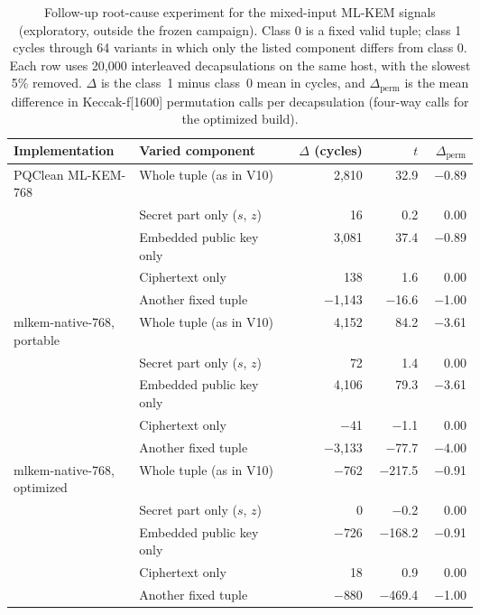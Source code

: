 \begin{table}[h]
\centering
\caption{Follow-up root-cause experiment for the mixed-input ML-KEM signals (exploratory, outside the frozen campaign). Class 0 is a fixed valid tuple; class 1 cycles through 64 variants in which only the listed component differs from class 0. Each row uses 20,000 interleaved decapsulations on the same host, with the slowest 5\% removed. $\Delta$ is the class~1 minus class~0 mean in cycles, and $\Delta_{\mathrm{perm}}$ is the mean difference in Keccak-f[1600] permutation calls per decapsulation (four-way calls for the optimized build).}
\label{tab:mlkem-rootcause}
\scriptsize
\setlength{\tabcolsep}{3pt}
\begin{tabular}{@{}>{\raggedright\arraybackslash}p{0.27\linewidth}>{\raggedright\arraybackslash}p{0.33\linewidth}rrr@{}}
\toprule
\textbf{Implementation} & \textbf{Varied component} & \textbf{$\Delta$ (cycles)} & \textbf{$t$} & \textbf{$\Delta_{\mathrm{perm}}$} \\
\midrule
PQClean ML-KEM-768 & Whole tuple (as in V10) & 2,810 & 32.9 & $-$0.89 \\
 & Secret part only ($s$, $z$) & 16 & 0.2 & 0.00 \\
 & Embedded public key only & 3,081 & 37.4 & $-$0.89 \\
 & Ciphertext only & 138 & 1.6 & 0.00 \\
 & Another fixed tuple & $-$1,143 & $-$16.6 & $-$1.00 \\
\midrule
mlkem-native-768, portable & Whole tuple (as in V10) & 4,152 & 84.2 & $-$3.61 \\
 & Secret part only ($s$, $z$) & 72 & 1.4 & 0.00 \\
 & Embedded public key only & 4,106 & 79.3 & $-$3.61 \\
 & Ciphertext only & $-$41 & $-$1.1 & 0.00 \\
 & Another fixed tuple & $-$3,133 & $-$77.7 & $-$4.00 \\
\midrule
mlkem-native-768, optimized & Whole tuple (as in V10) & $-$762 & $-$217.5 & $-$0.91 \\
 & Secret part only ($s$, $z$) & 0 & $-$0.2 & 0.00 \\
 & Embedded public key only & $-$726 & $-$168.2 & $-$0.91 \\
 & Ciphertext only & 18 & 0.9 & 0.00 \\
 & Another fixed tuple & $-$880 & $-$469.4 & $-$1.00 \\
\bottomrule
\end{tabular}
\end{table}
